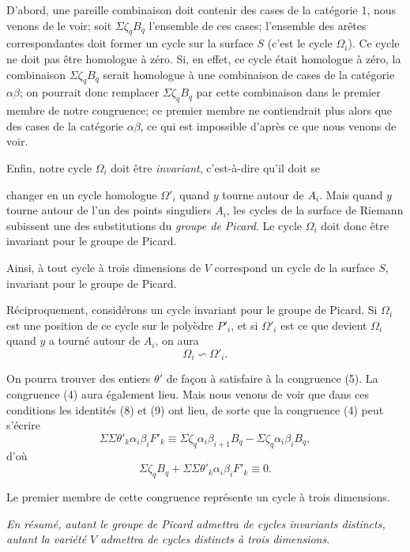 \documentclass{article}
\begin{document}
D'abord, une pareille combinaison doit contenir des cases de la catégorie 1, nous venons de le voir; soit $\Sigma \zeta_{q} B_{q}$ l'ensemble de ces cases; l'ensemble des arêtes correspondantes doit former un cycle sur la surface $S$ (c'est le cycle $\Omega_{i}$). Ce cycle ne doit pas être homologue à zéro. Si, en effet, ce cycle était homologue à zéro, la combinaison $\Sigma \zeta_{q} B_{q}$ serait homologue à une combinaison de cases de la catégorie $\alpha\beta$; on pourrait donc remplacer $\Sigma \zeta_{q} B_{q}$ par cette combinaison dans le premier membre de notre congruence; ce premier membre ne contiendrait plus alors que des cases de la catégorie $\alpha\beta$, ce qui est impossible d'après ce que nous venons de voir.

Enfin, notre cycle $\Omega_{i}$ doit être \emph{invariant}, c'est-à-dire qu'il doit se

changer en un cycle homologue $\Omega'_{i}$ quand $y$ tourne autour de $A_{i}$. Mais quand $y$ tourne autour de l'un des points singuliers $A_{i}$, les cycles de la surface de Riemann subissent une des substitutions du \emph{groupe de Picard}. Le cycle $\Omega_{i}$ doit donc être invariant pour le groupe de Picard.

Ainsi, à tout cycle à trois dimensions de $V$ correspond un cycle de la surface $S$, invariant pour le groupe de Picard.

Réciproquement, considérons un cycle invariant pour le groupe de Picard. Si $\Omega_{i}$ est une position de ce cycle sur le polyèdre $P'_{i}$, et si $\Omega'_{i}$ est ce que devient $\Omega_{i}$ quand $y$ a tourné autour de $A_{i}$, on aura
\[ \Omega_{i} \backsim \Omega'_{i}. \]

On pourra trouver des entiers $\theta'$ de façon à satisfaire à la congruence (5). La congruence (4) aura également lieu. Mais nous venons de voir que dans ces conditions les identités (8) et (9) ont lieu, de sorte que la congruence (4) peut s'écrire
\[ \Sigma \Sigma \theta'_{k} \alpha_{i}\beta_{i}F'_{k} \equiv \Sigma \zeta_{q} \alpha_{i}\beta_{i+1}B_{q} - \Sigma \zeta_{q} \alpha_{i}\beta_{i}B_{q}, \]
d'où
\[ \Sigma \zeta_{q} B_{q} + \Sigma \Sigma \theta'_{k} \alpha_{i}\beta_{i}F'_{k} \equiv 0. \]

Le premier membre de cette congruence représente un cycle à trois dimensions.

\emph{En résumé, autant le groupe de Picard admettra de cycles invariants distincts, autant la variété $V$ admettra de cycles distincts à trois dimensions}.
\end{document}
